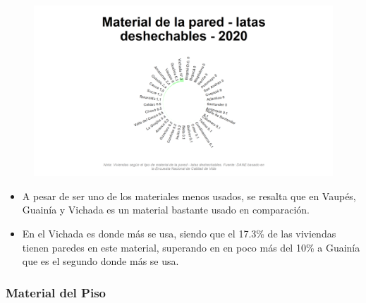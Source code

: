     \begin{figure}[H]
        \caption[Viviendas con pared de latas desechables por departamentos para 2020 ]{\label{pared_latas_dptos} }
        \begin{center}
        \includegraphics[width=\textwidth,keepaspectratio]{img/var_158_static.png}
        \end{center}
    \end{figure}
            \begin{itemize}
                    \item A pesar de ser uno de los materiales menos usados, se resalta que en Vaupés, Guainía y Vichada es un material bastante usado en comparación.
                    \item En el Vichada es donde más se usa, siendo que el 17.3\% de las viviendas tienen paredes en este material, superando en en poco más del 10\% a Guainía que es el segundo donde más se usa.
                    \end{itemize}

        \subsubsection{Material del Piso}

